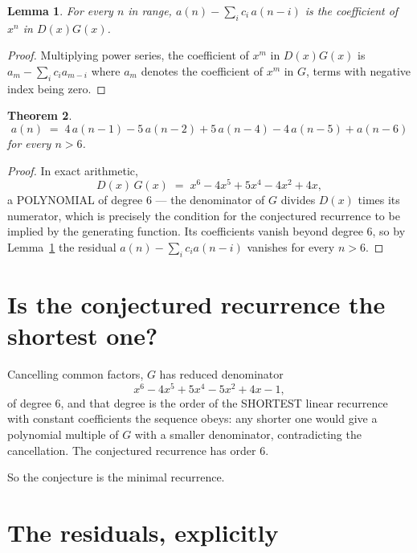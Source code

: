 \documentclass[11pt,a4paper]{article}
\theoremstyle{plain}
\newtheorem{theorem}{Theorem}
\newtheorem{lemma}[theorem]{Lemma}
\theoremstyle{definition}
\begin{document}
\begin{lemma}\label{lem:key}
For every $n$ in range, $a(n)-\sum_i c_i\,a(n-i)$ is the coefficient of $x^{n}$ in
$D(x)G(x)$.
\end{lemma}

\begin{proof}
Multiplying power series, the coefficient of $x^{m}$ in $D(x)G(x)$ is
$a_m-\sum_i c_i a_{m-i}$ where $a_m$ denotes the coefficient of $x^{m}$ in $G$, terms with
negative index being zero.
\end{proof}

\begin{theorem}
\[
a(n)\;=\;4\,a(n-1) - 5\,a(n-2) + 5\,a(n-4) - 4\,a(n-5) + a(n-6)
\]
for every $n>6$.
\end{theorem}

\begin{proof}
In exact arithmetic,
\[
D(x)\,G(x)\;=\;x^{6} - 4 x^{5} + 5 x^{4} - 4 x^{2} + 4 x,
\]
a POLYNOMIAL of degree $6$ --- the denominator of $G$ divides $D(x)$ times its numerator,
which is precisely the condition for the conjectured recurrence to be implied by the
generating function. Its coefficients vanish beyond degree $6$, so by
Lemma~\ref{lem:key} the residual $a(n)-\sum_ic_ia(n-i)$ vanishes for every
$n>6$.
\end{proof}

\section{Is the conjectured recurrence the shortest one?}

Cancelling common factors, $G$ has reduced denominator
\[
x^{6} - 4 x^{5} + 5 x^{4} - 5 x^{2} + 4 x - 1,
\]
of degree $6$, and that degree is the order of the SHORTEST linear recurrence with
constant coefficients the sequence obeys: any shorter one would give a polynomial multiple of
$G$ with a smaller denominator, contradicting the cancellation. The conjectured recurrence has
order $6$.

So the conjecture is the minimal recurrence.

\section{The residuals, explicitly}
\end{document}
